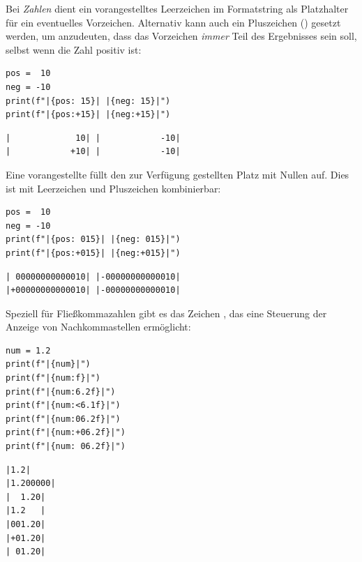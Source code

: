 Bei \emph{Zahlen} dient ein vorangestelltes Leerzeichen im Formatstring als Platzhalter für ein eventuelles Vorzeichen. Alternativ kann auch ein Pluszeichen (\inPy{+}) gesetzt werden, um anzudeuten, dass das Vorzeichen \emph{immer} Teil des Ergebnisses sein soll, selbst wenn die Zahl positiv ist:
\begin{codebox}
\begin{verbatim}
pos =  10
neg = -10
print(f"|{pos: 15}| |{neg: 15}|")
print(f"|{pos:+15}| |{neg:+15}|")
\end{verbatim}
\end{codebox}
\begin{cmdbox}
\begin{verbatim}
|             10| |            -10|
|            +10| |            -10|
\end{verbatim}
\end{cmdbox}

Eine vorangestellte  füllt den zur Verfügung gestellten Platz mit Nullen auf. Dies ist mit Leerzeichen und Pluszeichen kombinierbar: 
\begin{codebox}
\begin{verbatim}
pos =  10
neg = -10
print(f"|{pos: 015}| |{neg: 015}|")
print(f"|{pos:+015}| |{neg:+015}|")
\end{verbatim}
\end{codebox}
\begin{cmdbox}
\begin{verbatim}
| 00000000000010| |-00000000000010|
|+00000000000010| |-00000000000010|
\end{verbatim}
\end{cmdbox}

Speziell für Fließkommazahlen gibt es das Zeichen , das eine Steuerung der Anzeige von Nachkommastellen ermöglicht:
\begin{codebox}
\begin{verbatim}
num = 1.2
print(f"|{num}|")
print(f"|{num:f}|")
print(f"|{num:6.2f}|")
print(f"|{num:<6.1f}|")
print(f"|{num:06.2f}|")
print(f"|{num:+06.2f}|")
print(f"|{num: 06.2f}|")
\end{verbatim}
\end{codebox}
\begin{cmdbox}
\begin{verbatim}
|1.2|
|1.200000|
|  1.20|
|1.2   |
|001.20|
|+01.20|
| 01.20|
\end{verbatim}
\end{cmdbox}

